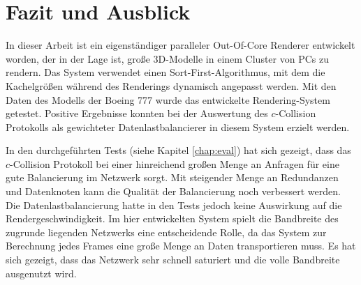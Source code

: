 %
%
%
%
%
%
%
%
%

\chapter{Fazit und Ausblick}
\label{conclusion}
%

In dieser Arbeit ist ein eigenständiger paralleler Out-Of-Core Renderer entwi\-ckelt worden, der in der Lage ist, große 3D-Modelle in einem Cluster von PCs zu rendern. Das System verwendet einen Sort-First-Algorithmus, mit dem die Kachelgrößen während des Renderings dynamisch angepasst werden. Mit den Daten des Modells der Boeing 777 wurde das entwickelte Rendering-System getestet. Positive Ergebnisse konnten bei der Auswertung des $c$-Collision Protokolls als gewichteter Datenlastbalancierer in diesem System erzielt werden. 


In den durchgeführten Tests (siehe Kapitel \ref{chap:eval}) hat sich gezeigt, dass das $c$-Collision Protokoll bei einer hinreichend großen Menge an Anfragen für eine gute Balancierung im Netzwerk sorgt. Mit steigender Menge an Redundanzen und Datenknoten kann die Qualität der Balancierung noch verbessert werden. Die Datenlastbalancierung hatte in den Tests jedoch keine Auswirkung auf die Rendergeschwindigkeit. Im hier entwickelten System spielt die Bandbreite des zugrunde liegenden Netzwerks eine entscheidende Rolle, da das System zur Berechnung jedes Frames eine große Menge an Daten transportieren muss. Es hat sich gezeigt, dass das Netzwerk sehr schnell saturiert und die volle Bandbreite ausgenutzt wird. 



